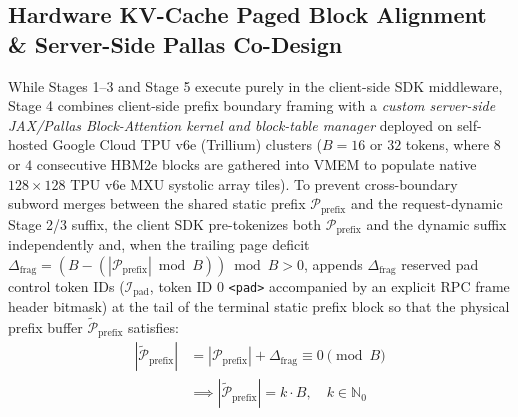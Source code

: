 \documentclass[conference,10pt]{IEEEtran}
\begin{document}
\subsection{Hardware KV-Cache Paged Block Alignment \& Server-Side Pallas Co-Design}
While Stages 1--3 and Stage 5 execute purely in the client-side SDK middleware, Stage 4 combines client-side prefix boundary framing with a \textit{custom server-side JAX/Pallas Block-Attention kernel and block-table manager} \cite{bradbury2018jax, pope2023efficiently} deployed on self-hosted Google Cloud TPU v6e (Trillium) clusters ($B = 16$ or $32$ tokens, where $8$ or $4$ consecutive HBM2e blocks are gathered into VMEM to populate native $128 \times 128$ TPU v6e MXU systolic array tiles). To prevent cross-boundary subword merges between the shared static prefix $\mathcal{P}_{\text{prefix}}$ and the request-dynamic Stage 2/3 suffix, the client SDK pre-tokenizes both $\mathcal{P}_{\text{prefix}}$ and the dynamic suffix independently and, when the trailing page deficit $\Delta_{\text{frag}} = (B - (|\mathcal{P}_{\text{prefix}}| \bmod B)) \bmod B > 0$, appends $\Delta_{\text{frag}}$ reserved pad control token IDs ($\mathcal{I}_{\text{pad}}$, token ID $0$ \texttt{<pad>} accompanied by an explicit RPC frame header bitmask) at the tail of the terminal static prefix block so that the physical prefix buffer $\tilde{\mathcal{P}}_{\text{prefix}}$ satisfies:
\begin{equation}
\label{eq:paged_alignment}
\begin{split}
|\tilde{\mathcal{P}}_{\text{prefix}}| &= |\mathcal{P}_{\text{prefix}}| + \Delta_{\text{frag}} \equiv 0 \pmod B \\
&\implies |\tilde{\mathcal{P}}_{\text{prefix}}| = k \cdot B, \quad k \in \mathbb{N}_0
\end{split}
\end{equation}
\end{document}
